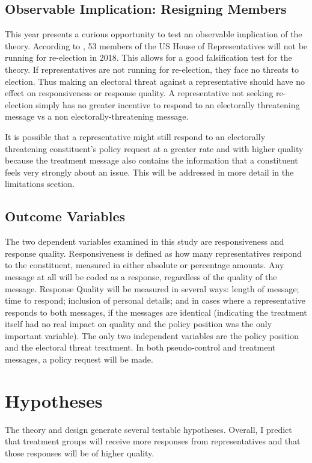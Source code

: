\documentclass[12pt]{article}
\begin{document}
\subsection{Observable Implication: Resigning Members}
This year presents a curious opportunity to test an observable implication of the theory. According to \cite{Ballotpedia:2018aa}, 53 members of the US House of Representatives will not be running for re-election in 2018. This allows for a good falsification test for the theory. If representatives are not running for re-election, they face no threats to election. Thus making an electoral threat against a representative should have no effect on responsiveness or response quality. A representative not seeking re-election simply has no greater incentive to respond to an electorally threatening message vs a non electorally-threatening message.

It is possible that a representative might still respond to an electorally threatening constituent's policy request at a greater rate and with higher quality because the treatment message also contains the information that a constituent feels very strongly about an issue. This will be addressed in more detail in the limitations section.

\subsection{Outcome Variables}
The two dependent variables examined in this study are responsiveness and response quality. Responsiveness is defined as how many representatives respond to the constituent, measured in either absolute or percentage amounts. Any message at all will be coded as a response, regardless of the quality of the message. Response Quality will be measured in several ways: length of message; time to respond; inclusion of personal details; and in cases where a representative responds to both messages, if the messages are identical (indicating the treatment itself had no real impact on quality and the policy position was the only important variable). The only two independent variables are the policy position and the electoral threat treatment. In both pseudo-control and treatment messages, a policy request will be made.

\section{Hypotheses}
The theory and design generate several testable hypotheses. Overall, I predict that treatment groups will receive more responses from representatives and that those responses will be of higher quality.
\end{document}
